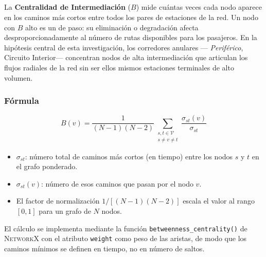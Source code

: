 \subsection{}
\label{subsec:res-centralidad-intermediacion}


La \textbf{Centralidad de Intermediación} ($B$) mide cuántas veces cada nodo
aparece en los caminos más cortos entre todos los pares de estaciones de la red.
Un nodo con $B$ alto es un  de paso: su eliminación o degradación
afecta desproporcionadamente al número de rutas disponibles para los pasajeros.
En la hipótesis central de esta investigación, los corredores anulares —
\textit{Periférico}, Circuito Interior— concentran nodos de alta intermediación
que articulan los flujos radiales de la red sin ser ellos mismos estaciones
terminales de alto volumen.

\subsubsection{Fórmula}
\label{subsubsec:formula-b}

\begin{equation}
    B(v) = \frac{1}{(N-1)(N-2)} \sum_{\substack{s,t \in \mathcal{V} \\ s \neq v \neq t}}
    \frac{\sigma_{st}(v)}{\sigma_{st}}
    \label{eq:centralidad-intermediacion}
\end{equation}

\begin{itemize}
    \item $\sigma_{st}$: número total de caminos más cortos (en tiempo) entre
    los nodos $s$ y $t$ en el grafo ponderado.
    \item $\sigma_{st}(v)$: número de esos caminos que pasan por el nodo $v$.
    \item El factor de normalización $1/[(N-1)(N-2)]$ escala el valor al rango
    $[0, 1]$ para un grafo de $N$ nodos.
\end{itemize}

El cálculo se implementa mediante la función \texttt{betweenness\_centrality()}
de \textsc{NetworkX} con el atributo \texttt{weight} como peso de las aristas,
de modo que los caminos mínimos se definen en tiempo, no en número de saltos.

